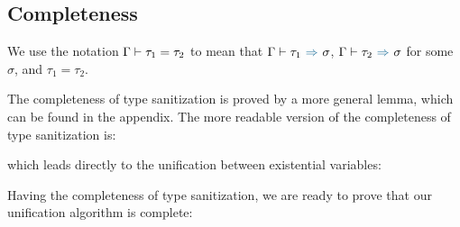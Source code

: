 \subsection{Completeness}

We use the notation $\Gamma \vdash \tau_1 = \tau_2$ to mean that
$\tctx \byinf \tau_1 \infto \sigma$, $\tctx \byinf \tau_2 \infto \sigma$ for
some $\sigma$,
and $\tau_1 = \tau_2$.

The completeness of type sanitization is proved by a more general lemma, which
can be found in the appendix. The more readable version of the completeness of
type sanitization is:

\begin{corollary}[\TypeSanitizationCompletenessPrettyName]
  \label{lemma:\TypeSanitizationCompletenessPrettyName}
  \TypeSanitizationCompletenessPrettyBody
\end{corollary}

\noindent which leads directly to the unification between existential variables:

\begin{lemma}[\TypeSanitizationCompletenessUnificationName]\leavevmode
  \label{lemma:\TypeSanitizationCompletenessUnificationName}
  \TypeSanitizationCompletenessUnificationBody
\end{lemma}

Having the completeness of type sanitization, we are ready to prove that our
unification algorithm is complete:

\begin{lemma}[\UnificationCompletenessName]
  \label{lemma:\UnificationCompletenessName}
    \UnificationCompletenessBody
\end{lemma}

